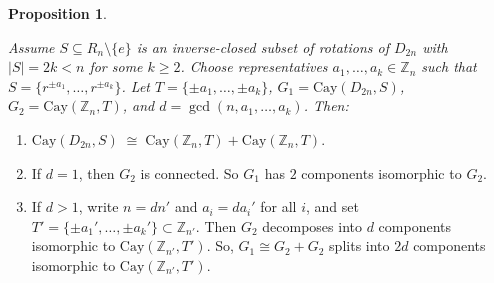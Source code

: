 \documentclass[12pt,reqno,a4paper]{amsart}
\theoremstyle{definition}
\newtheorem{prop}[defn]{Proposition}
\begin{document}
\begin{prop}\label{Proposition 3.1}
{\em
Assume $S\subseteq R_{n}\setminus\{e\}$ is an inverse-closed subset of rotations of $D_{2n}$ with $|S|=2k<n$ for some $k\ge2$.  
Choose representatives $a_1,\dots,a_k\in\mathbb{Z}_n$ such that 
$S=\{r^{\pm a_1},\dots,r^{\pm a_k}\}$.
Let $T = \{\pm a_1, \dots, \pm a_k\}$, 
$G_{1} = \mathrm{Cay}(D_{2n}, S)$, 
$G_{2} = \mathrm{Cay}(\mathbb{Z}_n, T)$, and $d = \gcd(n, a_1, \dots, a_k)$. Then:
\begin{enumerate}
  \item $\mathrm{Cay}(D_{2n}, S) \;\cong\; \mathrm{Cay}(\mathbb{Z}_n, T) + \mathrm{Cay}(\mathbb{Z}_n, T)$.
  
  \item If $d = 1$, then $G_{2}$ is connected. So $G_{1}$ has $2$ components isomorphic to $G_{2}$.
  
  \item If $d > 1$, write $n = d n'$ and $a_i = d a_i'$ for all $i$, and set 
  $T' = \{\pm a_1', \dots, \pm a_k'\} \subset \mathbb{Z}_{n'}$. 
  Then $G_{2}$ decomposes into $d$ components isomorphic to $\mathrm{Cay}(\mathbb{Z}_{n'}, T')$. 
  So, $G_{1} \cong G_{2} + G_{2}$ splits into $2d$ components isomorphic to $\mathrm{Cay}(\mathbb{Z}_{n'}, T')$.
\end{enumerate}
}
\end{prop}
\end{document}
